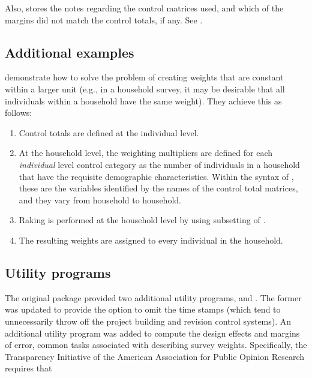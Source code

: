 Also,  stores the notes regarding the control matrices
used, and which of the margins did not match the control totals, if any.
See .

\subsection{Additional examples}


\citet{kolenikov:hammer:2015} demonstrate how to solve the problem of creating
weights that are constant within a larger unit (e.g., in a household survey,
it may be desirable that all individuals within a household have the same weight).
They achieve this as follows:
\begin{enumerate}
    \item Control totals are defined at the individual level.
    \item At the household level, the weighting multipliers are defined
        for each \textit{individual} level control category as the number
        of individuals in a household that have the requisite demographic characteristics.
        Within the syntax of , these are the variables
        identified by the  names of the control total matrices,
        and they vary from household to household.
    \item Raking is performed at the household level by using 
        subsetting of .
    \item The resulting weights are assigned to every individual in the household.
\end{enumerate}

\subsection{Utility programs}
\label{subsec:utility}

The original package  provided two additional utility programs,
 and .
The former was updated to provide the  option to omit the time stamps
(which tend to unnecessarily throw off the project building and revision control systems).
An additional utility program 
was added to compute the design effects and margins of error, common tasks associated
with describing survey weights. Specifically, the Transparency Initiative
of the American Association for Public Opinion Research
\citep{aapor:2014:ti:terms}
requires that

